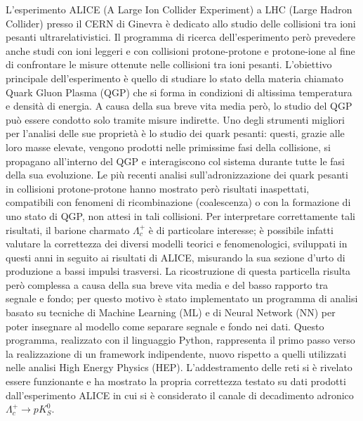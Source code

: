 L’esperimento ALICE (A Large Ion Collider Experiment) a LHC (Large Hadron Collider) presso il CERN di Ginevra è dedicato allo studio delle collisioni tra ioni pesanti ultrarelativistici. Il programma di ricerca dell’esperimento però prevedere anche studi con ioni leggeri e con collisioni protone-protone e protone-ione al fine di confrontare le misure ottenute nelle collisioni tra ioni pesanti. L’obiettivo principale dell’esperimento è quello di studiare lo stato della materia chiamato Quark Gluon Plasma (QGP) che si forma in condizioni di altissima temperatura e densità di energia. A causa della sua breve vita media però, lo studio del QGP può essere condotto solo tramite misure indirette. Uno degli strumenti migliori per l’analisi delle sue proprietà è lo studio dei quark pesanti: questi, grazie alle loro masse elevate, vengono prodotti nelle primissime fasi della collisione, si propagano all’interno del QGP e interagiscono col sistema durante tutte le fasi della sua evoluzione. Le più recenti analisi sull’adronizzazione dei quark pesanti in collisioni protone-protone hanno mostrato però risultati inaspettati, compatibili con fenomeni di ricombinazione (coalescenza) o con la formazione di uno stato di QGP, non attesi in tali collisioni. Per interpretare correttamente tali risultati, il barione charmato $\Lambda^{+}_{c}$ è di particolare interesse; è possibile infatti valutare la correttezza dei diversi modelli teorici e fenomenologici, sviluppati in questi anni in seguito ai risultati di ALICE, misurando la sua sezione d’urto di produzione a bassi impulsi trasversi. La ricostruzione di questa particella risulta però complessa a causa della sua breve vita media e del basso rapporto tra segnale e fondo; per questo motivo è stato implementato un programma di analisi basato su tecniche di Machine Learning (ML) e di Neural Network (NN) per poter insegnare al modello come separare segnale e fondo nei dati. Questo programma, realizzato con il linguaggio Python, rappresenta il primo passo verso la realizzazione di un framework indipendente, nuovo rispetto a quelli utilizzati nelle analisi High Energy Physics (HEP). L’addestramento delle reti si è rivelato essere funzionante e ha mostrato la propria correttezza testato su dati prodotti dall’esperimento ALICE in cui si è considerato il canale di decadimento adronico $\Lambda_{c}^{+} \to p K^{0}_{S}$.


